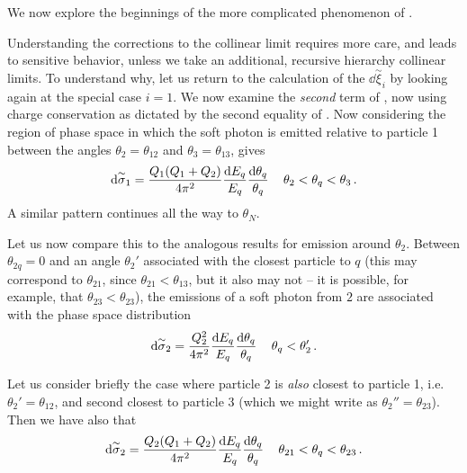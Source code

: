 \begin{example}
    \label{ex:charge-coherence}

    We now explore the beginnings of the more complicated phenomenon of .


    Understanding the corrections to the collinear limit requires more care, and leads to sensitive behavior, unless we take an additional, recursive hierarchy collinear limits.
    To understand why, let us return to the calculation of the \(\dd\overset{\sim}{\xi}_i\) by looking again at the special case \(i=1\).
    We now examine the \emph{second} term of , now using charge conservation as dictated by the second equality of .
    Now considering the region of phase space in which the soft photon is emitted relative to particle 1 between the angles \(\theta_2 = \theta_{12}\) and \(\theta_3 = \theta_{13}\),  gives
    \begin{align}
        \dd\overset{\sim}{\sigma}_1
        =
        \frac{Q_1(Q_1 + Q_2)}{4\pi^2}
        \frac{\dd E_q}{E_q}
        \frac{\dd\theta_q}{\theta_{q}}
        \,
        &&
        \theta_2 < \theta_q < \theta_3
        \,.
    \end{align}
    A similar pattern continues all the way to \(\theta_N\).

    Let us now compare this to the analogous results for emission around \(\theta_2\).
    Between \(\theta_{2q} = 0\) and an angle \(\theta_2'\) associated with the closest particle to \(q\) (this may correspond to \(\theta_{21}\), since \(\theta_{21} < \theta_{13}\), but it also may not -- it is possible, for example, that \(\theta_{23} < \theta_{23}\)), the emissions of a soft photon from \(2\) are associated with the phase space distribution
    \begin{align}
        \dd\overset{\sim}{\sigma}_2
        =
        \frac{Q_2^2}{4\pi^2}
        \frac{\dd E_q}{E_q}
        \frac{\dd\theta_q}{\theta_{q}}
        \,
        &&
        \theta_q < \theta_2'
        \,.
    \end{align}

    Let us consider briefly the case where particle 2 is \textit{also} closest to particle 1, i.e. \(\theta_2' = \theta_{12}\), and second closest to particle 3 (which we might write as \(\theta_2'' = \theta_{23}\)).
    Then we have also that
    \begin{align}
        \dd\overset{\sim}{\sigma}_2
        =
        \frac{Q_2(Q_1 + Q_2)}{4\pi^2}
        \frac{\dd E_q}{E_q}
        \frac{\dd\theta_q}{\theta_{q}}
        \,
        &&
        \theta_{21} < \theta_q < \theta_{23}
        \,.
    \end{align}



\end{example}
